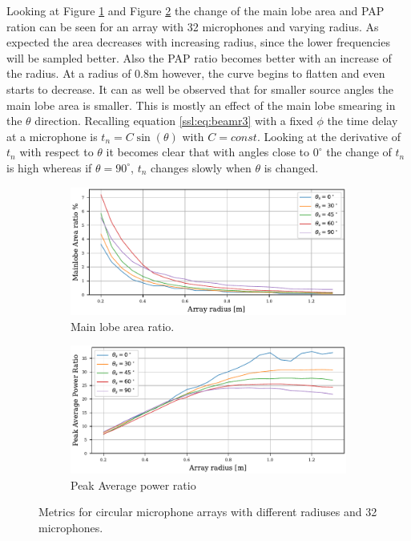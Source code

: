 Looking at Figure \ref*{aev:fig:areaCirc} and Figure \ref*{aev:fig:papCirc}
the change of the main lobe area and PAP ration can be seen for
an array with 32 microphones and varying radius.
As expected the area decreases with increasing radius, since the lower frequencies will be
sampled better.
Also the PAP ratio becomes better with an increase of the radius.
At a radius of 0.8m however, the curve begins to flatten and even starts to decrease.
It can as well be observed that for smaller source angles the main lobe area is smaller.
This is mostly an effect of the main lobe smearing in the $\theta$ direction.
Recalling equation \eqref{ssl:eq:beamr3} with a fixed $\phi$
the time delay at a microphone is $t_n = C \sin(\theta)$ with $C=const$.
Looking at the derivative of $t_n$ with respect to $\theta$ it becomes
clear that with angles close to $0^\circ$ the change of $t_n$ is high
whereas if $\theta = 90^\circ$, $t_n$ changes slowly when $\theta$ is
changed.
\begin{figure}[h!]
	\centering
	\begin{subfigure}[b]{1\textwidth}
		\centering
		\includegraphics[]{images/5_array_evaluation/area_circ.pdf}
		\caption{Main lobe area ratio.}
		\label{aev:fig:areaCirc}
	\end{subfigure}
	\begin{subfigure}[b]{1\textwidth}
		\centering
		\includegraphics[]{images/5_array_evaluation/PAP_circ.pdf}
		\caption{Peak Average power ratio}
		\label{aev:fig:papCirc}
	\end{subfigure}
	\caption{Metrics for circular microphone arrays with different radiuses and 32 microphones.}
	\label{aev:fig:metrCirc}
\end{figure}

